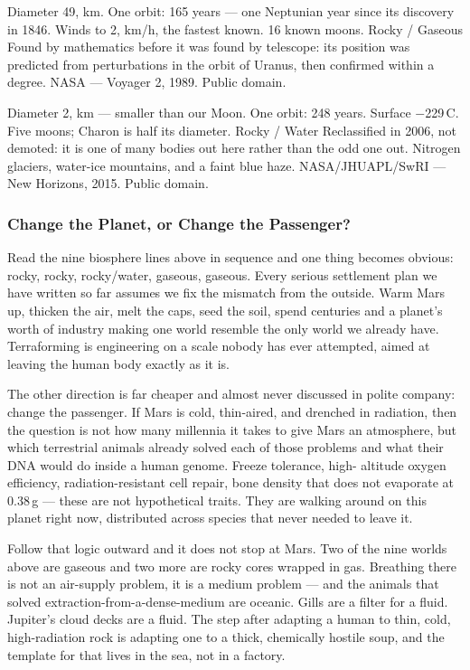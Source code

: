 {Diameter 49, km. One orbit: 165 years --- one Neptunian year since its discovery in 1846.
Winds to 2, km/h, the fastest known. 16 known moons.}
{Rocky / Gaseous}
{Found by mathematics before it was found by telescope: its position was predicted from
perturbations in the orbit of Uranus, then confirmed within a degree.}
{NASA --- Voyager 2, 1989. Public domain.}

{Diameter 2, km --- smaller than our Moon. One orbit: 248 years. Surface
$-$229\,\textdegree C. Five moons; Charon is half its diameter.}
{Rocky / Water}
{Reclassified in 2006, not demoted: it is one of many bodies out here rather than the odd one
out. Nitrogen glaciers, water-ice mountains, and a faint blue haze.}
{NASA/JHUAPL/SwRI --- New Horizons, 2015. Public domain.}


\subsubsection*{Change the Planet, or Change the Passenger?}

Read the nine biosphere lines above in sequence and one thing becomes obvious: rocky, rocky,
rocky/water, gaseous, gaseous. Every serious settlement plan we have written so far assumes we fix
the mismatch from the outside. Warm Mars up, thicken the air, melt the caps, seed the soil,
spend centuries and a planet's worth of industry making one world resemble the only world we
already have. Terraforming is engineering on a scale nobody has ever attempted, aimed at leaving
the human body exactly as it is.

The other direction is far cheaper and almost never discussed in polite company: change the
passenger. If Mars is cold, thin-aired, and drenched in radiation, then the question is not how
many millennia it takes to give Mars an atmosphere, but which terrestrial animals already solved
each of those problems and what their DNA would do inside a human genome. Freeze tolerance, high-
altitude oxygen efficiency, radiation-resistant cell repair, bone density that does not evaporate
at 0.38\,g --- these are not hypothetical traits. They are walking around on this planet right
now, distributed across species that never needed to leave it.

Follow that logic outward and it does not stop at Mars. Two of the nine worlds above are gaseous
and two more are rocky cores wrapped in gas. Breathing there is not an air-supply problem, it is a
medium problem --- and the animals that solved extraction-from-a-dense-medium are oceanic. Gills
are a filter for a fluid. Jupiter's cloud decks are a fluid. The step after adapting a human to
thin, cold, high-radiation rock is adapting one to a thick, chemically hostile soup, and the
template for that lives in the sea, not in a factory.


